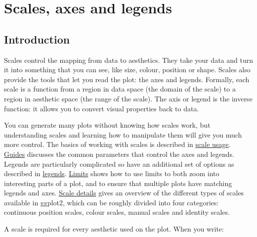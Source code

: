 \chapter{Scales, axes and legends}\label{cha:scales}

\section{Introduction}

Scales control the mapping from data to aesthetics. They take your data
and turn it into something that you can see, like size, colour, position
or shape. Scales also provide the tools that let you read the plot: the
axes and legends. Formally, each scale is a function from a region in
data space (the domain of the scale) to a region in aesthetic space (the
range of the scale). The axis or legend is the inverse function: it
allows you to convert visual properties back to data. 

You can generate many plots without knowing how scales work, but
understanding scales and learning how to manipulate them will give you
much more control. The basics of working with scales is described in
\hyperref[sec:scale-usage]{scale usage}. \hyperref[sec:guides]{Guides}
discusses the common parameters that control the axes and legends.
Legends are particularly complicated so have an additional set of
options as described in \hyperref[sec:legends]{legends}.
\hyperref[sec:limits]{Limits} shows how to use limits to both zoom into
interesting parts of a plot, and to ensure that multiple plots have
matching legends and axes. \hyperref[sec:scale-details]{Scale details}
gives an overview of the different types of scales available in ggplot2,
which can be roughly divided into four categories: continuous position
scales, colour scales, manual scales and identity scales.


A scale is required for every aesthetic used on the plot. When you
write:

\begin{Shaded}
\begin{Highlighting}[]
\StringTok{ }
\StringTok{  }\NormalTok{(}\NormalTok{(} 
\end{Highlighting}
\end{Shaded}

